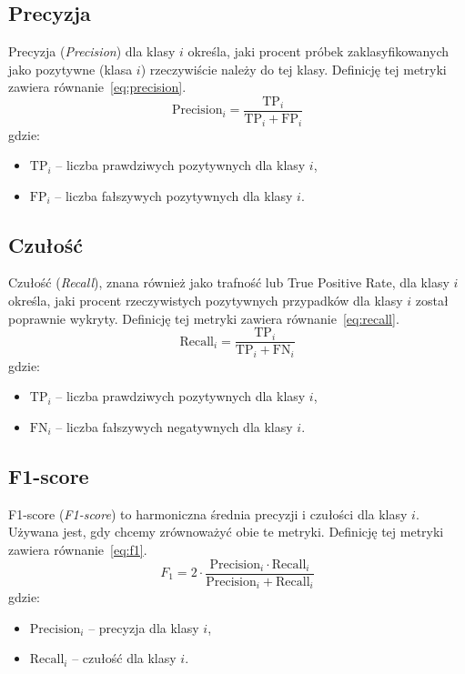 \documentclass{SGGW-thesis}
\begin{document}
\subsection{Precyzja}
Precyzja (\textit{Precision}) dla klasy \(i\) określa, jaki procent próbek zaklasyfikowanych jako pozytywne (klasa \(i\)) rzeczywiście należy do tej klasy. Definicję tej metryki zawiera równanie~\ref{eq:precision}.
\begin{equation}
\text{Precision}_i = \frac{\text{TP}_i}{\text{TP}_i + \text{FP}_i}
\label{eq:precision}
\end{equation}
gdzie:
\begin{itemize}
    \renewcommand{\labelitemi}{}
    \item \(\text{TP}_i\) – liczba prawdziwych pozytywnych dla klasy \(i\),
    \item \(\text{FP}_i\) – liczba fałszywych pozytywnych dla klasy \(i\).
\end{itemize}

\subsection{Czułość}
Czułość (\textit{Recall}), znana również jako trafność lub True Positive Rate, dla klasy \(i\) określa, jaki procent rzeczywistych pozytywnych przypadków dla klasy \(i\) został poprawnie wykryty. Definicję tej metryki zawiera równanie~\ref{eq:recall}.
\begin{equation}
\text{Recall}_i = \frac{\text{TP}_i}{\text{TP}_i + \text{FN}_i}
\label{eq:recall}
\end{equation}
gdzie:
\begin{itemize}
    \renewcommand{\labelitemi}{}
    \item \(\text{TP}_i\) – liczba prawdziwych pozytywnych dla klasy \(i\),
    \item \(\text{FN}_i\) – liczba fałszywych negatywnych dla klasy \(i\).
\end{itemize}

\subsection{F1-score}
F1-score (\textit{F1-score}) to harmoniczna średnia precyzji i czułości dla klasy \(i\). Używana jest, gdy chcemy zrównoważyć obie te metryki. Definicję tej metryki zawiera równanie~\ref{eq:f1}.
\begin{equation}
F_1 = 2 \cdot \frac{\text{Precision}_i \cdot \text{Recall}_i}{\text{Precision}_i + \text{Recall}_i}
\label{eq:f1}
\end{equation}
gdzie:
\begin{itemize}
    \renewcommand{\labelitemi}{}
    \item \(\text{Precision}_i\) – precyzja dla klasy \(i\),
    \item \(\text{Recall}_i\) – czułość dla klasy \(i\).
\end{itemize}
\end{document}
